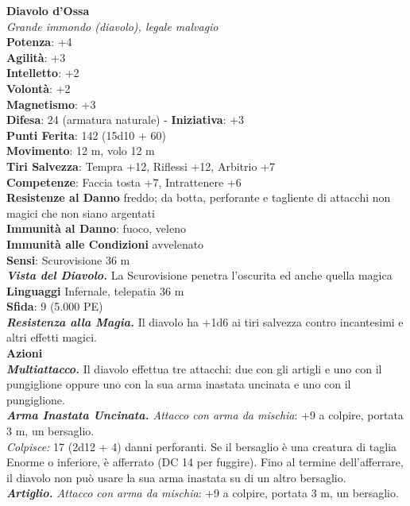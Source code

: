 \begin{multicols}{2}
\medskip\textbf{Diavolo d'Ossa}\\
\emph{Grande immondo (diavolo), legale malvagio}\\
\textbf{Potenza}: +4\\
\textbf{Agilità}: +3\\
\textbf{Intelletto}: +2\\
\textbf{Volontà}: +2\\
\textbf{Magnetismo}: +3\\
\textbf{Difesa}: 24 (armatura naturale) - \textbf{Iniziativa}: +3\\
\textbf{Punti Ferita}: 142 (15d10 + 60)\\
\textbf{Movimento}: 12 m, volo 12 m\\
\textbf{Tiri Salvezza}: Tempra +12, Riflessi +12, Arbitrio +7\\
\textbf{Competenze}: Faccia tosta +7, Intrattenere +6\\
\textbf{Resistenze al Danno} freddo; da botta, perforante e tagliente di attacchi non magici che non siano argentati\\
\textbf{Immunità al Danno}: fuoco, veleno\\
\textbf{Immunità alle Condizioni} avvelenato\\
\textbf{Sensi}: Scurovisione 36 m\\
\emph{\textbf{Vista del Diavolo.}} La Scurovisione penetra l'oscurita ed anche quella magica\\
\textbf{Linguaggi} Infernale, telepatia 36 m \\
\textbf{Sfida}: 9 (5.000 PE)\smallskip\\
\emph{\textbf{Resistenza alla Magia.}} Il diavolo ha +1d6 ai tiri salvezza contro incantesimi e altri effetti magici.\\
\smallskip\textbf{Azioni}\\
\emph{\textbf{Multiattacco.}} Il diavolo effettua tre attacchi: due con gli artigli e uno con il pungiglione oppure uno con la sua arma inastata uncinata e uno con il pungiglione.\\
\emph{\textbf{Arma Inastata Uncinata.} Attacco con arma da mischia}: +9 a colpire, portata 3 m, un bersaglio.\\
\emph{Colpisce:} 17 (2d12 + 4) danni perforanti. Se il bersaglio è una creatura di taglia Enorme o inferiore, è afferrato (DC 14 per fuggire). Fino al termine dell'afferrare, il diavolo non può usare la sua arma inastata su di un altro bersaglio.\\
\emph{\textbf{Artiglio.} Attacco con arma da mischia}: +9 a colpire, portata 3 m, un bersaglio.\\

\end{multicols}
